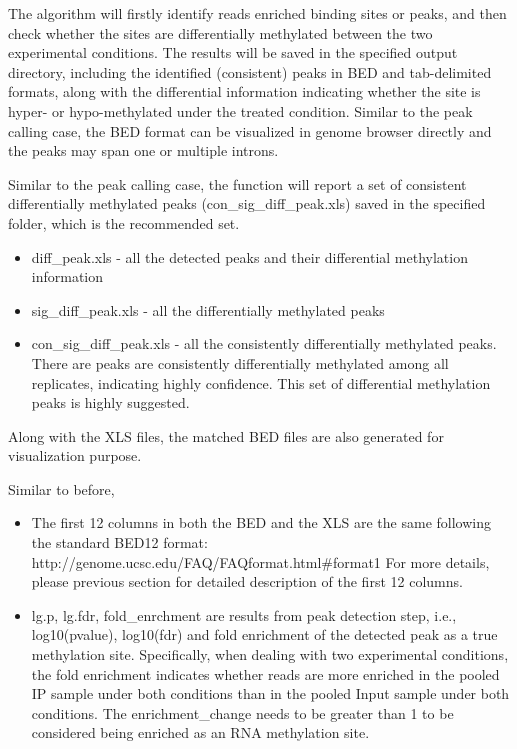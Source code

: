 \documentclass[]{article}
\begin{document}
{The algorithm will firstly identify reads enriched binding sites or peaks, and then check whether the sites are differentially methylated between the two experimental conditions. The results will be saved in the specified output directory, including the identified (consistent) peaks in BED and tab-delimited formats, along with the differential information indicating whether the site is hyper- or hypo-methylated under the treated condition. Similar to the peak calling case, the BED format can be visualized in genome browser directly and the peaks may span one or multiple introns. 

Similar to the peak calling case, the function will report a set of consistent differentially methylated peaks (con{\_}sig{\_}diff{\_}peak.xls) saved in the specified folder,  which is the recommended set. 
\begin{itemize}
  \item diff{\_}peak.xls - all the detected peaks and their differential methylation information
  \item sig{\_}diff{\_}peak.xls - all the differentially methylated peaks  
  \item con{\_}sig{\_}diff{\_}peak.xls - all the consistently differentially methylated peaks. There are peaks are consistently differentially methylated among all replicates, indicating highly confidence. This set of differential methylation peaks is highly suggested. 
\end{itemize}
Along with the XLS files, the matched BED files are also generated for visualization purpose. 

Similar to before, 
\begin{itemize}
  \item The first 12 columns in both the BED and the XLS are the same following the standard BED12 format: http://genome.ucsc.edu/FAQ/FAQformat.html{\#}format1
  For more details, please previous section for detailed description of the first 12 columns. 
  \item lg.p, lg.fdr, fold{\_}enrchment are results from peak detection step, i.e., log10(pvalue),  log10(fdr) and fold enrichment of the detected peak as a true methylation site. Specifically, when dealing with two experimental conditions, the fold enrichment indicates whether reads are more enriched in the pooled IP sample under both conditions than in the pooled Input sample under both conditions. The enrichment{\_}change needs to be greater than 1 to be considered being enriched as an RNA methylation site.  
  

\end{itemize}}
\end{document}
